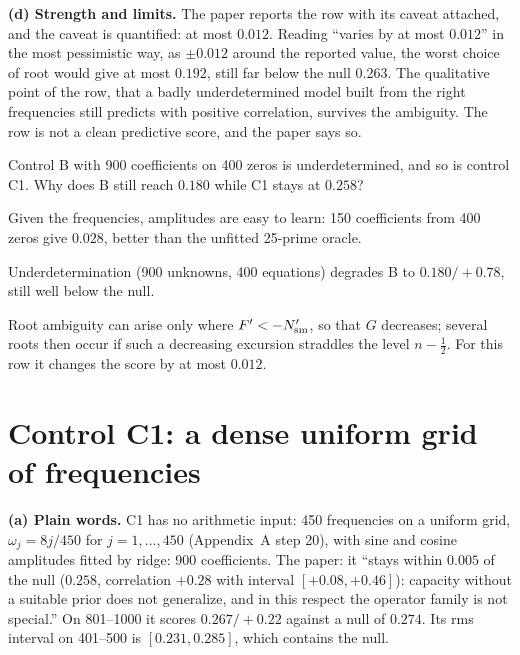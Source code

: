\textbf{(d) Strength and limits.} The paper reports the row with its caveat attached, and the caveat is quantified: at most $0.012$. Reading ``varies by at most $0.012$'' in the most pessimistic way, as $\pm0.012$ around the reported value, the worst choice of root would give at most $0.192$, still far below the null $0.263$. The qualitative point of the row, that a badly underdetermined model built from the right frequencies still predicts with positive correlation, survives the ambiguity. The row is not a clean predictive score, and the paper says so.

\begin{checkpoint}
Control B with 900 coefficients on 400 zeros is underdetermined, and so is control C1. Why does B still reach $0.180$ while C1 stays at $0.258$?
\end{checkpoint}

\begin{keyideas}
\item Given the frequencies, amplitudes are easy to learn: 150 coefficients from 400 zeros give $0.028$, better than the unfitted 25-prime oracle.
\item Underdetermination (900 unknowns, 400 equations) degrades B to $0.180/+0.78$, still well below the null.
\item Root ambiguity can arise only where $F'<-N_{\mathrm{sm}}'$, so that $G$ decreases; several roots then occur if such a decreasing excursion straddles the level $n-\tfrac12$. For this row it changes the score by at most $0.012$.
\end{keyideas}

\section{Control C1: a dense uniform grid of frequencies}\label{sec:paper-arithmetic-C1}

\textbf{(a) Plain words.} C1 has no arithmetic input: 450 frequencies on a uniform grid, $\omega_j=8j/450$ for $j=1,\dots,450$ (Appendix~A step 20), with sine and cosine amplitudes fitted by ridge: 900 coefficients. The paper: it ``stays within $0.005$ of the null ($0.258$, correlation $+0.28$ with interval $[+0.08,+0.46]$): capacity without a suitable prior does not generalize, and in this respect the operator family is not special.'' On 801--1000 it scores $0.267/+0.22$ against a null of $0.274$. Its rms interval on 401--500 is $[0.231,0.285]$, which contains the null.

